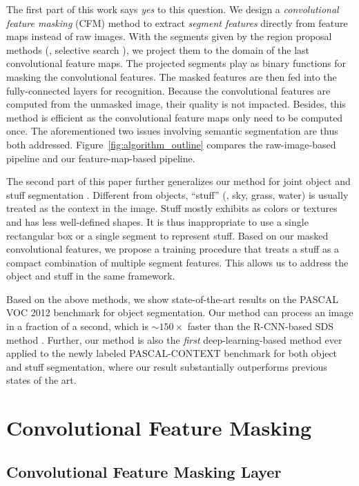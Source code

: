 \documentclass[10pt,twocolumn,letterpaper]{article}
\begin{document}
The first part of this work says \emph{yes} to this question. We design a \emph{convolutional feature masking} (CFM) method to extract \emph{segment features} directly from feature maps instead of raw images. With the segments given by the region proposal methods (\eg, selective search \cite{uijlings2013selective}), we project them to the domain of the last convolutional feature maps. The projected segments play as binary functions for masking the convolutional features. The masked features are then fed into the fully-connected layers for recognition. Because the convolutional features are computed from the unmasked image, their quality is not impacted. Besides, this method is efficient as the convolutional feature maps only need to be computed once. The aforementioned two issues involving semantic segmentation are thus both addressed. Figure~\ref{fig:algorithm_outline} compares the raw-image-based pipeline and our feature-map-based pipeline.

The second part of this paper further generalizes our method for joint object and stuff segmentation \cite{mottaghi2014role}. Different from objects, ``stuff'' \cite{mottaghi2014role} (\eg, sky, grass, water) is usually treated as the context in the image. Stuff mostly exhibits as colors or textures and has less well-defined shapes. It is thus inappropriate to use a single rectangular box or a single segment to represent stuff. Based on our masked convolutional features, we propose a training procedure that treats a stuff as a compact combination of multiple segment features. This allows us to address the object and stuff in the same framework.

Based on the above methods, we show state-of-the-art results on the PASCAL VOC 2012 benchmark \cite{everingham2010pascal} for object segmentation. Our method can process an image in a fraction of a second, which is $\sim$$150\times$ faster than the R-CNN-based SDS method \cite{hariharan2014simultaneous}.
Further, our method is also the \emph{first} deep-learning-based method ever applied to the newly labeled PASCAL-CONTEXT benchmark \cite{mottaghi2014role} for both object and stuff segmentation, where our result substantially outperforms previous states of the art.

\section{Convolutional Feature Masking}

\subsection{Convolutional Feature Masking Layer}
\end{document}
